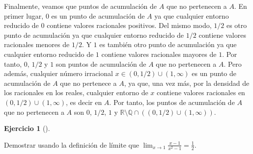 \documentclass[
  a4paper,
]{scrreport}
\theoremstyle{definition}
\newtheorem{exercise}{Ejercicio}[chapter]
\theoremstyle{remark}
\begin{document}
\begin{tcolorbox}
Finalmente, veamos que puntos de acumulación de \(A\) que no pertenecen
a \(A\). En primer lugar, \(0\) es un punto de acumulación de \(A\) ya
que cualquier entorno reducido de \(0\) contiene valores racionales
positivos. Del mismo modo, \(1/2\) es otro punto de acumulación ya que
cualquier entorno reducido de \(1/2\) contiene valores racionales
menores de \(1/2\). Y \(1\) es también otro punto de acumulación ya que
cualquier entorno reducido de \(1\) contiene valores racionales mayores
de \(1\). Por tanto, \(0\), \(1/2\) y \(1\) son puntos de acumulación de
\(A\) que no pertenecen a \(A\). Pero además, cualquier número
irracional \(x\in (0,1/2) \cup (1,\infty)\) es un punto de acumulación
de \(A\) que no pertenece a \(A\), ya que, una vez más, por la densidad
de los racionales en los reales, cualquier entorno de \(x\) contiene
valores racionales en \((0,1/2) \cup (1,\infty)\), es decir en \(A\).
Por tanto, los puntos de acumulación de \(A\) que no pertenecen a \(A\)
son \(0\), \(1/2\), \(1\) y
\(\mathbb{R}\setminus\mathbb{Q}\cap((0,1/2) \cup (1,\infty))\).

\end{tcolorbox}

\begin{exercise}[]\protect\hypertarget{exr-5}{}\label{exr-5}

Demostrar usando la definición de límite que
\(\lim_{x\to 1}\frac{x-1}{x^2-1} = \frac{1}{2}\).

\end{exercise}
\end{document}
